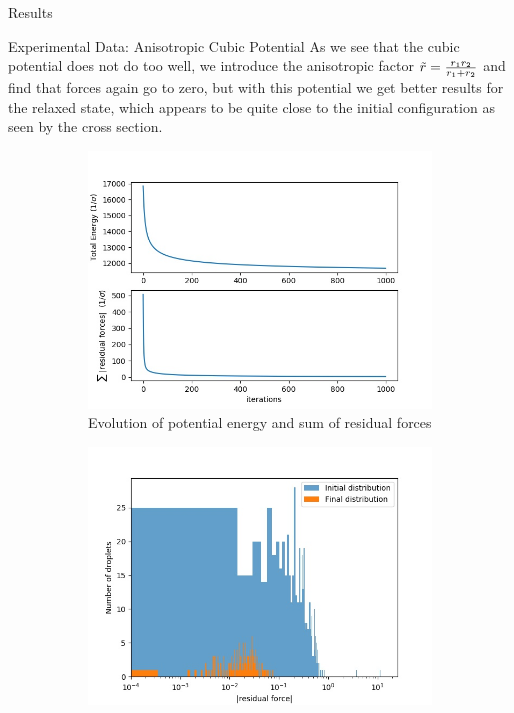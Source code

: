\documentclass[12pt]{article}
\begin{document}
\begin{section}{Results}
\newpage
\begin{subsection}{Experimental Data: Anisotropic Cubic Potential}
As we see that the cubic potential does not do too well, we introduce the anisotropic factor $\Tilde{r} = \frac{r_1 r_2}{r_1 + r_2}$ and find that forces again go to zero, but with this potential we get better results for the relaxed state, which appears to be quite close to the initial configuration as seen by the cross section.
\begin{figure}[h!]
    \begin{subfigure}{0.5\textwidth}
        \includegraphics[width=\linewidth]{images/emulsion_cubic_anisotropic_UandF.jpeg}
        \caption{Evolution of potential energy and sum of residual forces}
        \label{fig:sub1}
    \end{subfigure}
    \begin{subfigure}{0.5\textwidth}
        \includegraphics[width=\linewidth]{images/emulsion_cubic_anisotropic_residual_histogram.jpg}

\end{subfigure}
\end{figure}
\end{subsection}
\end{section}
\end{document}
